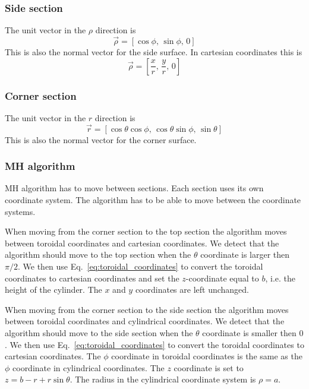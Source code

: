 \documentclass[a4paper,10pt]{article}
\numberwithin{equation}{section}
\begin{document}
\subsubsection{Side section}
The unit vector in the \(\rho\) direction is
\begin{equation}
  \vec{\rho} = \left[\cos{\phi},\, \sin{\phi},\, 0\right]
\end{equation}
This is also the normal vector for the side surface. In cartesian coordinates this is
\begin{equation}
  \vec{\rho} = \left[\frac{x}{r},\, \frac{y}{r},\, 0\right]
\end{equation}

\subsubsection{Corner section}
The unit vector in the \(r\) direction is
\begin{equation}
  \vec{r} = \left[ \cos{\theta}\cos{\phi},\, \cos{\theta}\sin{\phi},\, \sin{\theta} \right]
\end{equation}
This is also the normal vector for the corner surface.

\subsubsection[]{MH algorithm}
MH algorithm has to move between sections. Each section uses its own coordinate system. The algorithm has to be able to move between the coordinate systems.

When moving from the corner section to the top section the algorithm moves between toroidal coordinates and cartesian coordinates. We detect that the algorithm should
move to the top section when the \(\theta\) coordinate is larger then \(\pi/2\). We then use Eq.~\ref{eq:toroidal_coordinates} to convert the toroidal coordinates
to cartesian coordinates and set the \(z\)-coordinate equal to \(b\), i.e. the height of the cylinder. The \(x\) and \(y\) coordinates are left unchanged.

When moving from the corner section to the side section the algorithm moves between toroidal coordinates and cylindrical coordinates. We detect that the algorithm should
move to the side section when the \(\theta\) coordinate is smaller then \(0\). We then use Eq.~\ref{eq:toroidal_coordinates} to convert the toroidal coordinates
to cartesian coordinates. The \(\phi\) coordinate in toroidal coordinates is the same as the \(\phi\) coordinate in cylindrical coordinates. The \(z\) coordinate is
set to \(z = b - r + r\sin{\theta}\). The radius in the cylindrical coordinate system is \(\rho = a\).
\end{document}
